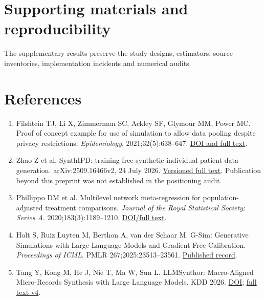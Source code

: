 \documentclass[sigconf,anonymous,review]{acmart}
\begin{document}
\section*{Supporting materials and reproducibility}

The supplementary results preserve the study designs, estimators, source inventories, implementation incidents and numerical audits.


\clearpage

\section*{References}

\begingroup

\begin{enumerate}

\item Filshtein TJ, Li X, Zimmerman SC, Ackley SF, Glymour MM, Power MC. Proof of concept example for use of simulation to allow data pooling despite privacy restrictions. \emph{Epidemiology}. 2021;32(5):638–\allowbreak{}647. \href{https://pmc.ncbi.nlm.nih.gov/articles/PMC8338788/}{DOI and full text}.

\item Zhao Z et al. SynthIPD: training-free synthetic individual patient data generation. arXiv:2509.16466v2, 24 July 2026. \href{https://arxiv.org/html/2509.16466v2}{Versioned full text}. Publication beyond this preprint was not established in the positioning audit.

\item Phillippo DM et al. Multilevel network meta-regression for population-adjusted treatment comparisons. \emph{Journal of the Royal Statistical Society: Series A}. 2020;183(3):1189–\allowbreak{}1210. \href{https://rss.onlinelibrary.wiley.com/doi/full/10.1111/rssa.12579}{DOI/\allowbreak{}full text}.

\item Holt S, Ruiz Luyten M, Berthon A, van der Schaar M. G-Sim: Generative Simulations with Large Language Models and Gradient-Free Calibration. \emph{Proceedings of ICML}. PMLR 267;2025:23513–\allowbreak{}23561. \href{https://proceedings.mlr.press/v267/holt25b.html}{Published record}.

\item Tang Y, Kong M, He J, Nie T, Ma W, Sun L. LLMSynthor: Macro-Aligned Micro-Records Synthesis with Large Language Models. KDD 2026. \href{https://doi.org/10.1145/3770855.3818965}{DOI}; \href{https://arxiv.org/html/2505.14752v4}{full text v4}.


\end{enumerate}
\end{document}
